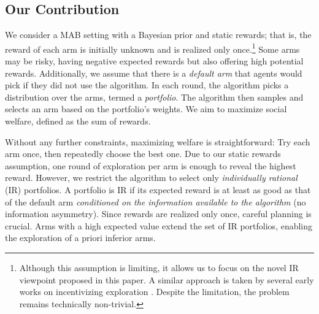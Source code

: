 \subsection{Our Contribution}
We consider a MAB setting with a Bayesian prior and static rewards; that is, the reward of each arm is initially unknown and is realized only once.\footnote{Although this assumption is limiting, it allows us to focus on the novel IR viewpoint proposed in this paper. A similar approach is taken by several early works on incentivizing exploration \cite{Bahar2016,cohen2019optimal,Fiduciary}. Despite the limitation, the problem remains technically non-trivial.} Some arms may be risky, having negative expected rewards but also offering high potential rewards. Additionally, we assume that there is a \textit{default arm} that agents would pick if they did not use the algorithm. In each round, the algorithm picks a distribution over the arms, termed a \textit{portfolio}. The algorithm then samples and selects an arm based on the portfolio's weights. We aim to maximize social welfare, defined as the sum of rewards.


Without any further constraints, maximizing welfare is straightforward: Try each arm once, then repeatedly choose the best one. Due to our static rewards assumption, one round of exploration per arm is enough to reveal the highest reward. However, we restrict the algorithm to select only \textit{individually rational} (IR) portfolios. A portfolio is IR if its expected reward is at least as good as that of the default arm \emph{conditioned on the information available to the algorithm} (no information asymmetry). Since rewards are realized only once, careful planning is crucial. Arms with a high expected value extend the set of IR portfolios, enabling the exploration of a priori inferior arms.

